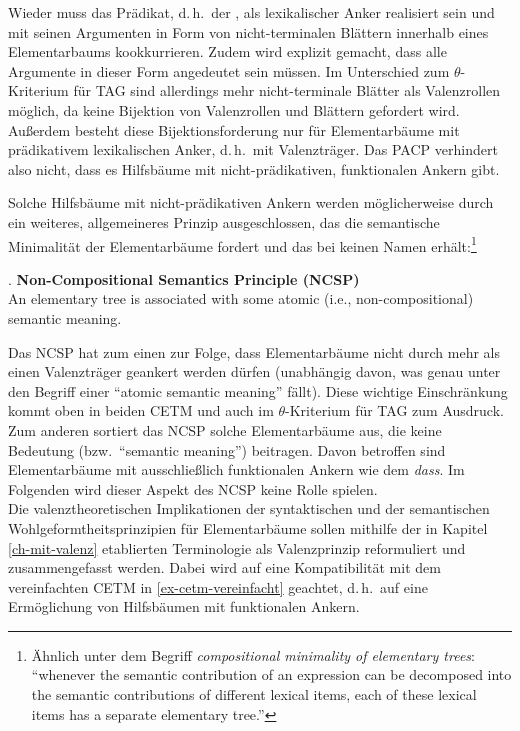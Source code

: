 Wieder muss das Prädikat, d.\,h.\ der , als lexikalischer Anker realisiert sein und mit seinen Argumenten in Form von nicht-terminalen Blättern innerhalb eines Elementarbaums kookkurrieren. Zudem wird explizit gemacht, dass alle Argumente in dieser Form angedeutet sein müssen. Im Unterschied zum $\theta$-Kriterium für TAG sind allerdings mehr nicht-terminale Blätter als Valenzrollen möglich, da keine Bijektion von Valenzrollen und Blättern gefordert wird. Au\ss erdem  besteht diese Bijektionsforderung nur für Elementarbäume mit prädikativem lexikalischen Anker, d.\,h.\ mit Valenzträger. Das PACP verhindert also nicht, dass es Hilfsbäume mit nicht-prädikativen, funktionalen Ankern gibt.  

Solche Hilfsbäume mit nicht-prädikativen Ankern werden möglicherweise durch ein weiteres, allgemeineres Prinzip ausgeschlossen, das die semantische Minimalität der Elementarbäume fordert und das bei \cite{Abeille:Rambow:00} keinen Namen erhält:\footnote{Ähnlich \citet[5]{Kallmeyer:Romero:08} unter dem Begriff {\it compositional minimality of elementary trees}: "`whenever the semantic contribution of an expression can be decomposed into the semantic contributions of different lexical items, each of these lexical items has a separate elementary tree."'}

\ex. {\bf Non-Compositional Semantics Principle (NCSP)} \\
An elementary tree is associated with some atomic (i.e., non-compositio\-nal) semantic meaning.

Das NCSP hat zum einen zur Folge, dass Elementarbäume nicht durch mehr als einen Valenzträger geankert werden dürfen (unabhängig davon, was genau unter den Begriff einer "`atomic semantic meaning"' fällt). Diese wichtige Einschränkung kommt oben in beiden CETM und auch im $\theta$-Kriterium für TAG zum Ausdruck. Zum anderen sortiert das NCSP solche Elementarbäume aus, die keine Bedeutung (bzw.\ "`semantic meaning"') beitragen. Davon betroffen sind Elementarbäume mit ausschließlich funktionalen Ankern wie dem  \textit{dass}. Im Folgenden wird dieser Aspekt des NCSP keine Rolle spielen.  \\

Die valenztheoretischen Implikationen der syntaktischen und der semantischen Wohlgeformtheitsprinzipien für Elementarbäume sollen mithilfe der in Kapitel \ref{ch-mit-valenz} etablierten Terminologie als Valenzprinzip reformuliert und zusammengefasst werden. Dabei wird auf eine Kompatibilität mit dem vereinfachten CETM in \ref{ex-cetm-vereinfacht} geachtet, d.\,h.\ auf eine Ermöglichung von Hilfsbäumen mit funktionalen Ankern.


